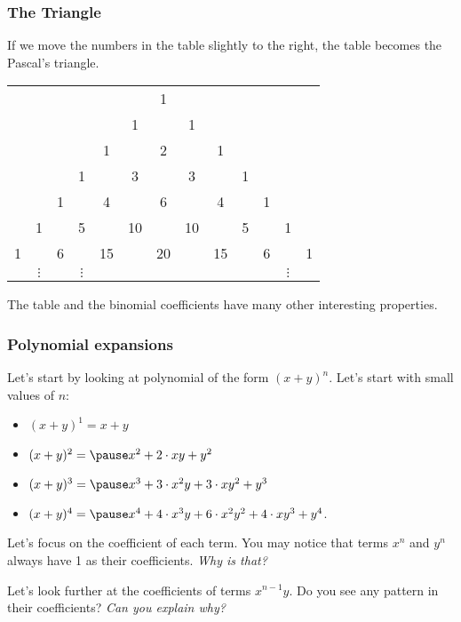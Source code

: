 \begin{frame}\frametitle{The Triangle}
  If we move the numbers in the table slightly to the right, the table
  becomes the Pascal's triangle.
  \pause

  \vspace{0.1in}

  \begin{tcolorbox}
  \begin{tabular}{ccccccccccccc}
    & & & & & & 1 & & & & & & \\
    & & & & & 1 & & 1 & & & & & \\
    & & & & 1 & & 2 & & 1 & & & & \\
    & & & 1 & & 3 & & 3 & & 1 & & & \\
    & & 1 & & 4 & & 6 & & 4 & & 1 & & \\
    & 1 & & 5 & & 10 & & 10 & & 5 & & 1 & \\
    1 & & 6 & & 15 & & 20 & & 15 & & 6 & & 1 \\
    & $\vdots$ & & $\vdots$ & & & & & & & & $\vdots$ & \\
  \end{tabular}
  \end{tcolorbox}

  \vspace{0.1in}
  
  The table and the binomial coefficients have many other interesting
  properties.
\end{frame}

\begin{frame}\frametitle{Polynomial expansions}
  Let's start by looking at polynomial of the form $(x+y)^n$.  Let's
  start with small values of $n$:
  \begin{itemize}
  \item $(x+y)^1=x+y$
  \item $(x+y)^2 = \pause x^2 + 2\cdot xy + y^2$\\
  \item \pause $(x+y)^3 = \pause x^3 + 3\cdot x^2y + 3\cdot xy^2 + y^3$\\
  \item \pause $(x+y)^4 = \pause x^4 + 4\cdot x^3y + 6\cdot x^2y^2 + 4\cdot xy^3 + y^4$.
  \end{itemize}
  
  \vspace{0.1in}
  Let's focus on the coefficient of each term.  You may notice that
  terms $x^n$ and $y^n$ always have 1 as their coefficients.  {\em Why
    is that?} \pause

  Let's look further at the coefficients of terms $x^{n-1}y$.  Do you
  see any pattern in their coefficients?  {\em Can you explain why?}
\end{frame}


